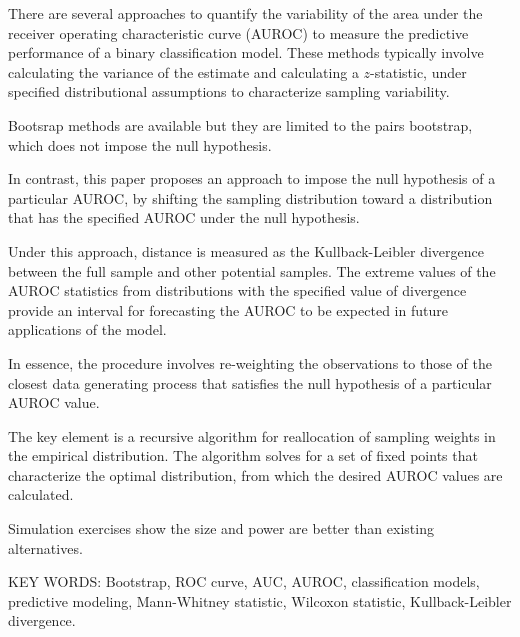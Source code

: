 There are several approaches to quantify the variability of the area under the receiver operating characteristic curve (AUROC) to measure the predictive performance of a binary classification model.
%
These methods typically involve calculating the variance of the estimate and calculating a $z$-statistic, under specified distributional assumptions
to characterize sampling variability.
%

Bootsrap methods are available but they are limited to the pairs bootstrap, 
which does not impose the null hypothesis. 

%
In contrast, this paper proposes an approach
to impose the null hypothesis of a particular AUROC,
by shifting the sampling distribution
toward a distribution that has the specified AUROC under the null hypothesis.
%

%
Under this approach, distance is measured as the Kullback-Leibler divergence between the full sample and other potential samples.
%
The extreme values of the AUROC statistics from distributions with the specified value of divergence
provide an interval for forecasting the AUROC to be expected in future applications of the model.
%

In essence, the procedure involves re-weighting the observations to
those of
the closest data generating process
that satisfies the null hypothesis of a particular AUROC value.


The key element is a recursive algorithm for reallocation of sampling weights in the empirical distribution.
The algorithm solves for a set of fixed points that characterize the optimal distribution,
from which the desired AUROC values are calculated.


Simulation exercises show the size and power are better than existing alternatives.



\vspace{0.10in}




KEY WORDS: Bootstrap, ROC curve, AUC, AUROC, classification models, predictive modeling, Mann-Whitney statistic, Wilcoxon statistic, Kullback-Leibler divergence.




\vspace{0.10in}


